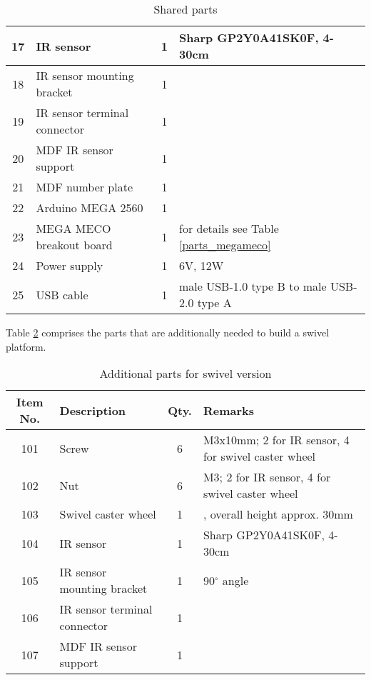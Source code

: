 \documentclass[10pt,a4paper]{article}
\begin{document}
\begin{table}[h]
\begin{tabular}{| c | l | c | l|}
		17 & IR sensor & 1 & \footnotesize Sharp GP2Y0A41SK0F, 4-30cm\\ \hline
		18 & IR sensor mounting bracket & 1 & \\ \hline
		19 & IR sensor terminal connector & 1 & \\ \hline
		20 & MDF IR sensor support & 1 & \\ \hline
		21 & MDF number plate & 1 & \\ \hline
		22 & Arduino MEGA 2560 & 1 & \\ \hline
		23 & MEGA MECO breakout board & 1 & \footnotesize for details see Table \ref{parts_megameco}\\ \hline
		24 & Power supply & 1 & \footnotesize 6V, 12W\\ \hline
		25 & USB cable & 1 & \footnotesize male USB-1.0 type B to male USB-2.0 type A\\ \hline
	\end{tabular}
	\caption{Shared parts}\label{parts_general}
\end{table}

\newpage
\noindent Table \ref{parts_swivel} comprises the parts that are additionally needed to build a swivel platform.
\begin{table}[H]
	\centering
	\begin{tabular}{| c | l | c | l|}
		\hline
		Item No. & Description & Qty. & Remarks \\ \hline
	 101 & Screw & 6 & \footnotesize M3x10mm; 2 for IR sensor, 4 for swivel caster wheel\\ \hline
	 102 & Nut & 6 & \footnotesize M3; 2 for IR sensor, 4 for swivel caster wheel\\ \hline
	 103 & Swivel caster wheel & 1 & \footnotesize \diameter25mm, overall height approx. 30mm\\ \hline
	 104 & IR sensor & 1 & \footnotesize Sharp GP2Y0A41SK0F, 4-30cm\\ \hline
	 105 & IR sensor mounting bracket & 1 & \footnotesize 90$^\circ$ angle\\ \hline
	 106 & IR sensor terminal connector & 1 & \\ \hline
	 107 & MDF IR sensor support & 1 & \\ \hline
	\end{tabular}
	\caption{Additional parts for swivel version}\label{parts_swivel}
\end{table}
\end{document}
